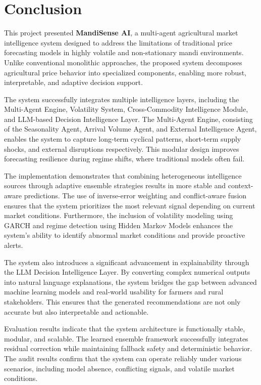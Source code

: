 \documentclass[12pt,a4paper]{report}
\begin{document}
\section{Conclusion}

This project presented \textbf{MandiSense AI}, a multi-agent agricultural market intelligence system designed to address the limitations of traditional price forecasting models in highly volatile and non-stationary mandi environments. Unlike conventional monolithic approaches, the proposed system decomposes agricultural price behavior into specialized components, enabling more robust, interpretable, and adaptive decision support.

The system successfully integrates multiple intelligence layers, including the Multi-Agent Engine, Volatility System, Cross-Commodity Intelligence Module, and LLM-based Decision Intelligence Layer. The Multi-Agent Engine, consisting of the Seasonality Agent, Arrival Volume Agent, and External Intelligence Agent, enables the system to capture long-term cyclical patterns, short-term supply shocks, and external disruptions respectively. This modular design improves forecasting resilience during regime shifts, where traditional models often fail.

The implementation demonstrates that combining heterogeneous intelligence sources through adaptive ensemble strategies results in more stable and context-aware predictions. The use of inverse-error weighting and conflict-aware fusion ensures that the system prioritizes the most relevant signal depending on current market conditions. Furthermore, the inclusion of volatility modeling using GARCH and regime detection using Hidden Markov Models enhances the system's ability to identify abnormal market conditions and provide proactive alerts.

The system also introduces a significant advancement in explainability through the LLM Decision Intelligence Layer. By converting complex numerical outputs into natural language explanations, the system bridges the gap between advanced machine learning models and real-world usability for farmers and rural stakeholders. This ensures that the generated recommendations are not only accurate but also interpretable and actionable.

Evaluation results indicate that the system architecture is functionally stable, modular, and scalable. The learned ensemble framework successfully integrates residual correction while maintaining fallback safety and deterministic behavior. The audit results confirm that the system can operate reliably under various scenarios, including model absence, conflicting signals, and volatile market conditions.
\end{document}
